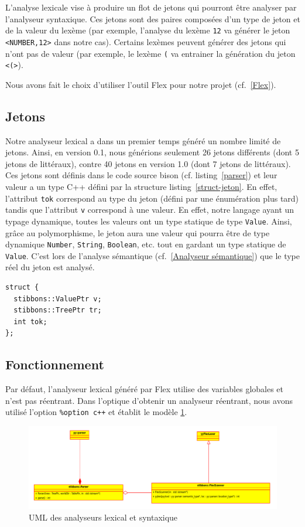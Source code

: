 L'analyse lexicale vise à produire un flot de jetons qui pourront être analyser par l'analyseur syntaxique. Ces jetons sont des paires composées d'un type de jeton et de la valeur du lexème (par exemple, l'analyse du lexème \verb|12| va générer le jeton \verb|<NUMBER,12>| dans notre cas). Certains lexèmes peuvent générer des jetons qui n'ont pas de valeur (par exemple, le lexème \verb|(| va entrainer la génération du jeton \verb|<(>|).

Nous avons fait le choix d'utiliser l'outil Flex pour notre projet (cf.~\ref{Flex}).

\subsection{Jetons}
Notre analyseur lexical a dans un premier temps généré un nombre limité de jetons. Ainsi, en version 0.1, nous générions seulement 26 jetons différents (dont 5 jetons de littéraux), contre 40 jetons en version 1.0 (dont 7 jetons de littéraux). Ces jetons sont définis dans le code source bison (cf. listing~\ref{parser}) et leur valeur a un type C++ défini par la structure listing~\ref{struct-jeton}. En effet, l'attribut \verb|tok| correspond au type du jeton (défini par une énumération plus tard) tandis que l'attribut \verb|v| correspond à une valeur. En effet, notre langage ayant un typage dynamique, toutes les valeurs ont un type statique de type \verb|Value|. Ainsi, grâce au polymorphisme, le jeton aura une valeur qui pourra être de type dynamique \verb|Number|, \verb|String|, \verb|Boolean|, etc. tout en gardant un type statique de \verb|Value|. C'est lors de l'analyse sémantique (cf.~\ref{Analyseur sémantique}) que le type réel du jeton est analysé.

\begin{lstlisting}[label=struct-jeton,caption=Type des valeurs des jetons]
struct {
  stibbons::ValuePtr v;
  stibbons::TreePtr tr;
  int tok;
};
\end{lstlisting}

\subsection{Fonctionnement}
Par défaut, l'analyseur lexical généré par Flex utilise des variables globales et n'est pas réentrant. Dans l'optique d'obtenir un analyseur réentrant, nous avons utilisé l'option \verb|%option c++| et établit le modèle \ref{uml-lexer}.

\begin{figure}[h]
\centering
\includegraphics[scale=0.6]{doc/report/uml/reentrant-parser}
\caption{\label{uml-lexer} UML des analyseurs lexical et syntaxique}
\end{figure}

